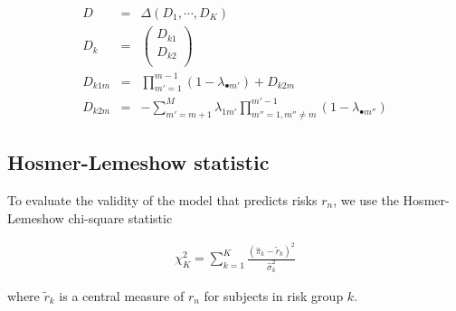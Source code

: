 \documentclass[11pt]{article}
\begin{document}
\begin{eqnarray}
D & = & \Delta(D_1, \cdots, D_K) \\
D_k & = & \left( 
            \begin{array} {c}
                D_{k1} \\
                D_{k2}\\
            \end{array}
          \right)\\
D_{k1m} & = & \prod_{m'=1}^{m-1}(1-\lambda_{\bullet m'}) + D_{k2m} \\
D_{k2m} & = & -\sum_{m'=m+1}^M \lambda_{1m'} \prod_{m''=1, m'' \neq
                       m}^{m'-1}(1-\lambda_{\bullet m''}) 
\end{eqnarray}




\subsection{Hosmer-Lemeshow statistic}

To evaluate the validity of the model that predicts risks $r_n$, we use the
Hosmer-Lemeshow chi-square statistic

\begin{eqnarray}
\chi^2_K = \sum_{k=1}^K \frac{(\hat{\pi}_k - \tilde{r}_k)^2}{\hat{\sigma}^2_k}
\end{eqnarray}

where $\tilde{r}_k$ is a central measure of $r_n$ for subjects in risk
group $k$. 
\end{document}
